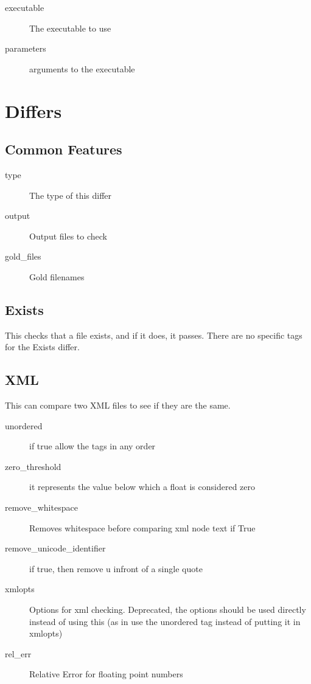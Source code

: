 \documentclass{article}
\begin{document}
\begin{description}
  \item[executable] The executable to use
  \item[parameters] arguments to the executable
\end{description}

\section{Differs}

\subsection{Common Features}

\begin{description}
  \item[type] The type of this differ
  \item[output] Output files to check
  \item[gold\_files] Gold filenames
\end{description}

\subsection{Exists}

This checks that a file exists, and if it does, it passes.  There are
no specific tags for the Exists differ.

\subsection{XML}

This can compare two XML files to see if they are the same.

\begin{description}
  \item[unordered] if true allow the tags in any order
  \item[zero\_threshold] it represents the value below which a float is considered zero
  \item[remove\_whitespace] Removes whitespace before comparing xml node text if True
  \item[remove\_unicode\_identifier] if true, then remove u infront of a single quote
  \item[xmlopts] Options for xml checking. Deprecated, the options should be used directly instead of using this (as in use the unordered tag instead of putting it in xmlopts)
  \item[rel\_err] Relative Error for floating point numbers
\end{description}
\end{document}
